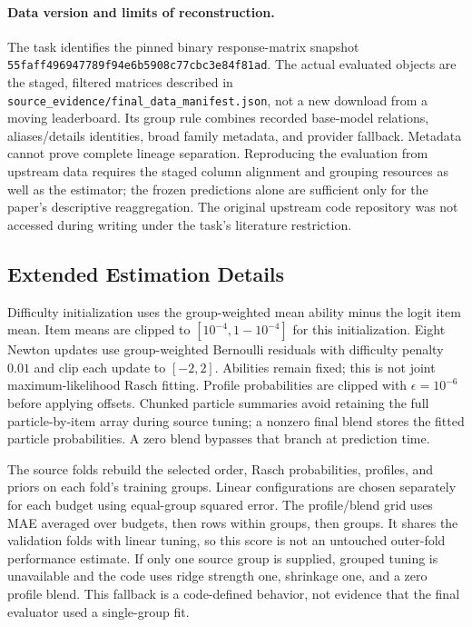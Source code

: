 \documentclass{article}
\begin{document}
\paragraph{Data version and limits of reconstruction.}
The task identifies the pinned binary response-matrix snapshot \texttt{55faff496947789f94e6b5908c77cbc3e84f81ad}. The actual evaluated objects are the staged, filtered matrices described in \texttt{source\_evidence/final\_data\_manifest.json}, not a new download from a moving leaderboard. Its group rule combines recorded base-model relations, aliases/details identities, broad family metadata, and provider fallback. Metadata cannot prove complete lineage separation. Reproducing the evaluation from upstream data requires the staged column alignment and grouping resources as well as the estimator; the frozen predictions alone are sufficient only for the paper's descriptive reaggregation. The original upstream code repository was not accessed during writing under the task's literature restriction.

\subsection{Extended Estimation Details}
Difficulty initialization uses the group-weighted mean ability minus the logit item mean. Item means are clipped to $[10^{-4},1-10^{-4}]$ for this initialization. Eight Newton updates use group-weighted Bernoulli residuals with difficulty penalty $0.01$ and clip each update to $[-2,2]$. Abilities remain fixed; this is not joint maximum-likelihood Rasch fitting. Profile probabilities are clipped with $\epsilon=10^{-6}$ before applying offsets. Chunked particle summaries avoid retaining the full particle-by-item array during source tuning; a nonzero final blend stores the fitted particle probabilities. A zero blend bypasses that branch at prediction time.

The source folds rebuild the selected order, Rasch probabilities, profiles, and priors on each fold's training groups. Linear configurations are chosen separately for each budget using equal-group squared error. The profile/blend grid uses MAE averaged over budgets, then rows within groups, then groups. It shares the validation folds with linear tuning, so this score is not an untouched outer-fold performance estimate. If only one source group is supplied, grouped tuning is unavailable and the code uses ridge strength one, shrinkage one, and a zero profile blend. This fallback is a code-defined behavior, not evidence that the final evaluator used a single-group fit.
\end{document}
